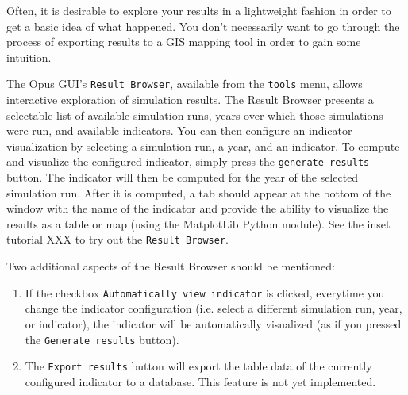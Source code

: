 Often, it is desirable to explore your results in a lightweight
fashion in order to get a basic idea of what happened. You don't
necessarily want to go through the process of exporting results to a
GIS mapping tool in order to gain some intuition. 

The Opus GUI's \verb#Result Browser#, available from the \verb#tools#
menu, allows interactive exploration of simulation results. The Result
Browser presents a selectable list of available simulation runs, years
over which those simulations were run, and available indicators. You
can then configure an indicator visualization by selecting a simulation
run, a year, and an indicator. To compute and visualize the configured
indicator, simply press the \verb#generate results# button. The
indicator will then be computed for the year of the selected simulation
run. After it is computed, a tab should appear at the bottom of the
window with the name of the indicator and provide the ability to
visualize the results as a table or map (using the MatplotLib Python
module). See the inset tutorial XXX to try out the 
\verb#Result Browser#.


Two additional aspects of the Result Browser should be mentioned:
\begin{enumerate}
  \item If the checkbox \verb#Automatically view indicator# is
  clicked, everytime you change the indicator configuration (i.e.
  select a different simulation run, year, or indicator), the
  indicator will be automatically visualized (as if you pressed the
  \verb#Generate results# button). 
  \item The \verb#Export results# button will export the table data
  of the currently configured indicator to a database. This feature
  is not yet implemented. 
\end{enumerate}

